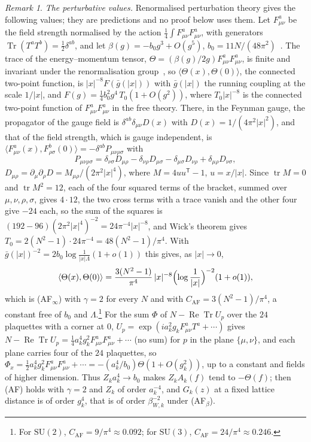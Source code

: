 \documentclass[aps,prd,twocolumn,superscriptaddress,nofootinbib,longbibliography,floatfix,amsmath,amssymb,10pt]{revtex4-2}
\theoremstyle{definition}
\theoremstyle{remark}
\newtheorem{remark}[theorem]{Remark}
\newcommand{\SU}{\mathrm{SU}}
\newcommand{\Tr}{\operatorname{Tr}}
\newcommand{\ReTr}{\operatorname{Re}\operatorname{Tr}}
\newcommand{\ip}[2]{\langle #1,#2\rangle}
\begin{document}
\begin{remark}\label{rem:limitEafpert}
\emph{The perturbative values.} Renormalised perturbation theory gives the
following values; they are predictions and no proof below uses them. Let
$F^a_{\mu\nu}$ be the field strength normalised by the action $\frac14\int
F^a_{\mu\nu}F^a_{\mu\nu}$, with generators $\Tr(T^aT^b)=\frac12\delta^{ab}$,
and let $\beta(g)=-b_0g^3+O(g^5)$, $b_0=11N/(48\pi^2)$~\cite{GW73,Pol73}.
The trace of the energy--momentum tensor, $\Theta=(\beta(g)/2g)F^a_{\mu\nu}
F^a_{\mu\nu}$, is finite and invariant under the renormalisation
group~\cite{CDJ77}, so $\ip{\Theta(x)}{\Theta(0)}$, the connected two-point
function, is $|x|^{-8}F(\bar g(|x|))$ with $\bar g(|x|)$ the running coupling
at the scale $1/|x|$, and $F(g)=\frac14b_0^2g^4\,T_0(1+O(g^2))$, where
$T_0|x|^{-8}$ is the connected two-point function of $F^a_{\mu\nu}
F^a_{\mu\nu}$ in the free theory. There, in the Feynman gauge, the
propagator of the gauge field is $\delta^{ab}\delta_{\mu\nu}D(x)$ with
$D(x)=1/(4\pi^2|x|^2)$, and that of the field strength, which is gauge
independent, is $\ip{F^a_{\mu\nu}(x)}{F^b_{\rho\sigma}(0)}=-\delta^{ab}
P_{\mu\nu\rho\sigma}$ with
\[
P_{\mu\nu\rho\sigma}=\delta_{\nu\sigma}D_{\mu\rho}-\delta_{\nu\rho}
D_{\mu\sigma}-\delta_{\mu\sigma}D_{\nu\rho}+\delta_{\mu\rho}D_{\nu\sigma},
\]
$D_{\mu\rho}=\partial_\mu\partial_\rho D=M_{\mu\rho}/(2\pi^2|x|^4)$, where $M=4uu^{\mathsf T}-1$,
$u=x/|x|$. Since $\operatorname{tr}M=0$ and $\operatorname{tr}M^2=12$, each
of the four squared terms of the bracket, summed over $\mu,\nu,\rho,\sigma$,
gives $4\cdot12$, the two cross terms with a trace vanish and the other four
give $-24$ each, so the sum of the squares is $(192-96)(2\pi^2|x|^4)^{-2}=
24\pi^{-4}|x|^{-8}$, and Wick's theorem gives $T_0=2(N^2-1)\cdot24\pi^{-4}=
48(N^2-1)/\pi^4$. With $\bar g(|x|)^{-2}=2b_0\log\frac1{|x|\Lambda}(1+o(1))$
this gives, as $|x|\to0$,
\[
\ip{\Theta(x)}{\Theta(0)}=\frac{3(N^2-1)}{\pi^4}\,|x|^{-8}\Bigl(\log\frac1
{|x|}\Bigr)^{-2}(1+o(1)),
\]
which is (AF$_\infty$) with $\gamma=2$ for every $N$ and with
$C_{\mathrm{AF}}=3(N^2-1)/\pi^4$, a constant free of $b_0$ and $\Lambda$.\footnote{For $\SU(2)$, $C_{\mathrm{AF}}=9/\pi^4\approx0.092$; for
$\SU(3)$, $C_{\mathrm{AF}}=24/\pi^4\approx0.246$.}
For the sum $\Phi$ of $N-\ReTr U_p$ over the $24$ plaquettes with a corner
at $0$, $U_p=\exp(ia_k^2g_kF^a_{\mu\nu}T^a+\cdots)$ gives $N-\ReTr U_p=
\frac14a_k^4g_k^2F^a_{\mu\nu}F^a_{\mu\nu}+\cdots$ (no sum) for $p$ in the
plane $\{\mu,\nu\}$, and each plane carries four of the $24$ plaquettes, so
$\Phi_x=\frac12a_k^4g_k^2F^a_{\mu\nu}F^a_{\mu\nu}+\cdots=-(a_k^4/b_0)
\Theta(1+O(g_k^2))$, up to a constant and fields of higher dimension. Thus
$Z_ka_k^4\to b_0$ makes $Z_kA_k(f)$ tend to $-\Theta(f)$; then (AF) holds
with $\gamma=2$ and $Z_k$ of order $a_k^{-4}$, and $G_k(z)$ at a fixed
lattice distance is of order $g_k^4$, that is of order $\beta_{W,k}^{-2}$
under (AF$_\beta$).
\end{remark}
\end{document}
